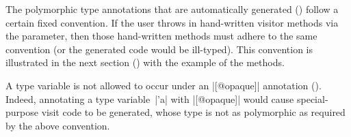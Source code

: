 \documentclass[11pt,a4paper,twoside]{article}
\begin{document}

The polymorphic type annotations that are automatically generated
() follow a certain fixed convention. If the
user throws in hand-written visitor methods via the \ancestors parameter, then
those hand-written methods must adhere to the same convention (or the
generated code would be ill-typed). This convention is illustrated in the next
section () with the example of the
 methods.

A type variable is not allowed to occur under an \oc|[@opaque]| annotation
(). Indeed, annotating a type variable~\oc|'a| with
\oc|[@opaque]| would cause special-purpose visit code to be generated, whose
type is not as polymorphic as required by the above convention.

\end{document}
